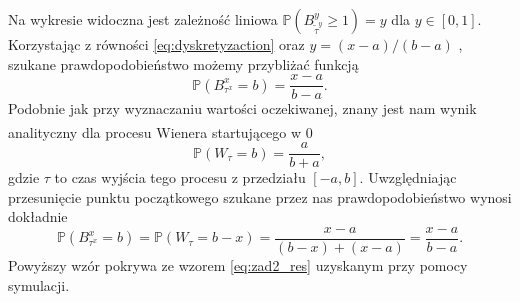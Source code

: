 \documentclass[12pt]{mwart}
\begin{document}
	\noindent Na wykresie widoczna jest zależność liniowa $\mathbb{P}\left(B^y_{\widetilde{\tau}^y}\geqslant1\right) = y$ dla $y\in[0, 1]$. Korzystając z równości \eqref{eq:dyskretyzaction} oraz $y=(x-a)/(b-a)$ , szukane prawdopodobieństwo możemy przybliżać funkcją
	\begin{equation}\label{eq:zad2_res}
		\mathbb{P}\left(B^x_{{\tau}^x}= b\right)=\frac{x-a}{b-a}.
	\end{equation}
	Podobnie jak przy wyznaczaniu wartości oczekiwanej, znany jest nam wynik analityczny\textsuperscript{\cite{art}} dla procesu Wienera startującego w 0
	\begin{equation*}
		\mathbb{P}\left(W_{\tau}=b\right)=\frac{a}{b+a},
	\end{equation*}
	gdzie $\tau$ to czas wyjścia tego procesu z przedziału $[-a, b]$. Uwzględniając przesunięcie punktu początkowego szukane przez nas prawdopodobieństwo wynosi dokładnie
	\begin{equation*}
			\mathbb{P}\left(B^x_{\tau^x}=b\right)=\mathbb{P}\left(W_{\tau}=b-x\right)=\frac{x-a}{(b-x)+(x-a)}=\frac{x-a}{b-a}.
	\end{equation*}
	Powyższy wzór pokrywa ze wzorem \eqref{eq:zad2_res} uzyskanym przy pomocy symulacji.









	
\end{document}
